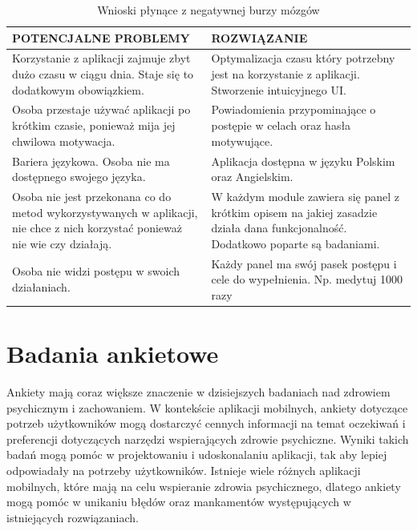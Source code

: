 \begin{table}[h]
    \centering
    \begin{tabular}{ | m{} | m{} | }
        \hline
        POTENCJALNE PROBLEMY                                      & ROZWIĄZANIE
        \\
        \hline
        Korzystanie z aplikacji zajmuje zbyt dużo czasu w ciągu dnia. Staje się
        to dodatkowym obowiązkiem.                                &
        Optymalizacja czasu który potrzebny jest na korzystanie z aplikacji.
        Stworzenie intuicyjnego UI.
        \\
        \hline
        Osoba przestaje używać aplikacji po krótkim czasie, ponieważ mija jej
        chwilowa motywacja.                                       &
        Powiadomienia przypominające o postępie w celach oraz hasła motywujące.
        \\
        \hline
        Bariera językowa. Osoba nie ma dostępnego swojego języka. & Aplikacja
        dostępna w języku Polskim oraz Angielskim. \\
        \hline
        Osoba nie jest przekonana co do metod wykorzystywanych w aplikacji, nie
        chce z nich korzystać ponieważ nie wie czy działają.      & W każdym
        module zawiera się panel z krótkim opisem na jakiej zasadzie działa dana
        funkcjonalność. Dodatkowo poparte są badaniami. \\
        \hline
        Osoba nie widzi postępu w swoich działaniach.             & Każdy panel
        ma swój pasek postępu i cele do wypełnienia. Np. medytuj 1000 razy \\
        \hline
    \end{tabular}
    \caption{Wnioski płynące z negatywnej burzy mózgów}
    \label{burza}
\end{table}

\section{Badania ankietowe}
Ankiety mają coraz większe znaczenie w dzisiejszych badaniach nad zdrowiem
psychicznym i zachowaniem. W kontekście aplikacji mobilnych, ankiety dotyczące
potrzeb użytkowników mogą dostarczyć cennych informacji na temat oczekiwań i
preferencji dotyczących narzędzi wspierających zdrowie psychiczne. Wyniki takich
badań mogą pomóc w projektowaniu i udoskonalaniu aplikacji, tak aby lepiej
odpowiadały na potrzeby użytkowników. Istnieje wiele różnych aplikacji
mobilnych, które mają na celu wspieranie zdrowia psychicznego, dlatego ankiety
mogą pomóc w unikaniu błędów oraz mankamentów występujących w istniejących
rozwiązaniach.

